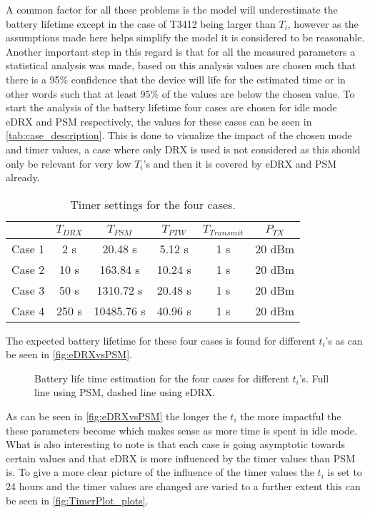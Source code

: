 A common factor for all these problems is the model will underestimate the battery lifetime except in the case of T3412 being larger than $T_i$, however as the assumptions made here helps simplify the model it is considered to be reasonable. Another important step in this regard is that for all the measured parameters a statistical analysis was made, based on this analysis values are chosen such that there is a 95\% confidence that the device will life for the estimated time or in other words such that at least 95\% of the values are below the chosen value. To start the analysis of the battery lifetime four cases are chosen for idle mode eDRX and PSM respectively, the values for these cases can be seen in \autoref{tab:case_description}. This is done to visualize the impact of the chosen mode and timer values, a case where only DRX is used is not considered as this should only be relevant for very low $T_i$'s and then it is covered by eDRX and PSM already.

\begin{table}[H]
\centering
\begin{tabular}{|c|c|c|c|c|c|} \hline
		& $T_{DRX}$	& $T_{PSM}$	& $T_{PTW}$	& $T_{Transmit}$	& $P_{TX}$ 	\\ \hline
Case 1	& 2 s 		& 20.48 s	& 5.12 s	& 1 s				& 20 dBm	\\ \hline
Case 2	& 10 s		& 163.84 s	& 10.24 s	& 1 s				& 20 dBm	\\ \hline
Case 3	& 50 s		& 1310.72 s	& 20.48 s	& 1 s				& 20 dBm	\\ \hline
Case 4	& 250 s		& 10485.76 s& 40.96 s	& 1 s				& 20 dBm	\\ \hline
\end{tabular}
\caption{Timer settings for the four cases.}
\label{tab:case_description}
\end{table}

The expected battery lifetime for these four cases is found for different $t_i$'s as can be seen in \autoref{fig:eDRXvsPSM}.

\begin{figure}[H]
\centering
{}
\resizebox{0.7\textwidth}{!}{
}
\caption{Battery life time estimation for the four cases for different $t_i$'s. Full line using PSM, dashed line using eDRX.}
\label{fig:eDRXvsPSM}
\end{figure}

As can be seen in \autoref{fig:eDRXvsPSM} the longer the $t_i$ the more impactful the these parameters become which makes sense as more time is spent in idle mode. What is also interesting to note is that each case is going asymptotic towards certain values and that eDRX is more influenced by the timer values than PSM is. To give a more clear picture of the influence of the timer values the $t_i$ is set to 24 hours and the timer values are changed are varied to a further extent this can be seen in \autoref{fig:TimerPlot_plots}.


